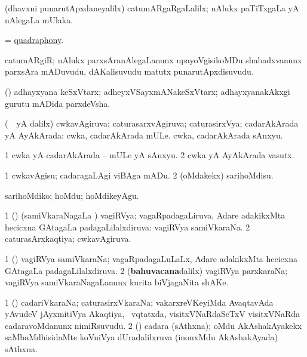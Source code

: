 \bentry
{}
\gl{\kirxvi}
\bmng
(dhavxni punarutApxdaneyalilx) catumARgaRgaLalilx; nAlukx paTiTxgaLa yA nAlegaLa mUlaka. 
\emng
\eentry

\bentry
{}
\gl{\nA}
\bmng
= \hyperlink{quadraphony}{quadraphony}. 
\emng
\eentry

\bentry
{}
\gl{\nA}
\bmng
catumARgiR; nAlukx parxsAranAlegaLanunx upayoVgisikoMDu shabadxvanunx parxsAra mADuvudu, dAKalisuvudu matutx punarutApxdisuvudu. 
\emng
\eentry

\bentry
{}
\gl{\nA}
\bmng
(\pari) adhayxyana keSxVtarx; adheyxVSayxmANakeSxVtarx; adhayxyanakAkxgi gurutu mADida parxdeVsha. 
\emng
\eentry

\bentry
{}
\gl{\gu}
\bmng
(\kanmu\ \aMrashA\ yA \pArxvi dalilx) cwkavAgiruva; caturasarxvAgiruva; caturasirxVya; cadarAkArada yA AyAkArada:   cwka, cadarAkArada mULe.   cwka, cadarAkArada sAnxyu. 
\emng
\eentry

\bentry
{}
\gl{\nA}
\bmng
\bnum
\num{1} cwka yA cadarAkArada -- mULe yA sAnxyu. 
\num{2} cwka yA AyAkArada vasutx. 
\enum
\emng
\eentry

\bentry
{}
\gl{\sakirx}
\bmng
\bnum
\num{1} cwkavAgisu; cadaragaLAgi viBAga mADu. 
\num{2} (oMdakekx) sarihoMdisu. 
\enum
\emng

\noindent
\gl{\akirx}
\expl{}
\bmng
sarihoMdiko; hoMdu; hoMdikeyAgu. 
\emng
\eentry

\bentry
{}
\gl{\gu}
\bmng
\bnum
\num{1} (\ga) (samiVkaraNagaLa \vi) vagiRVya; vagaRpadagaLiruva, Adare adakikxMta hecicxna GAtagaLa padagaLilalxdiruva:   vagiRVya samiVkaraNa. 
\num{2} caturasArxkaqtiya; cwkavAgiruva. 
\enum
\emng
\eentry

\bentry
{}
\gl{\nA}
\bmng
\bnum
\num{1} (\ga) vagiRVya samiVkaraNa; vagaRpadagaLuLaLx, Adare adakikxMta hecicxna GAtagaLa padagaLilalxdiruva. 
\num{2} (\textbf{bahuvacana}dalilx) vagiRVya parxkaraNa; vagiRVya samiVkaraNagaLanunx kurita biVjagaNita shAKe. 
\enum
\emng
\eentry

\bentry
{}
\gl{\nA}
\bmng
\bnum
\num{1} (\ga) cadariVkaraNa; caturasirxVkaraNa; vakarxreVKeyiMda AvaqtavAda yAvudeV jAyxmitiVya Akaqtiya, \kanmu\ vqtatxda, visitxVNaRdaSeTxV visitxVNaRda cadaravoMdanunx nimiRsuvudu. 
\num{2} (\Kavi) cadara (sAthxna); oMdu AkAshakAyakekx saMbaMdhisidaMte  koVniVya dUradalilxruva (inonxMdu AkAshakAyada) sAthxna. 
\enum
\emng
\eentry

